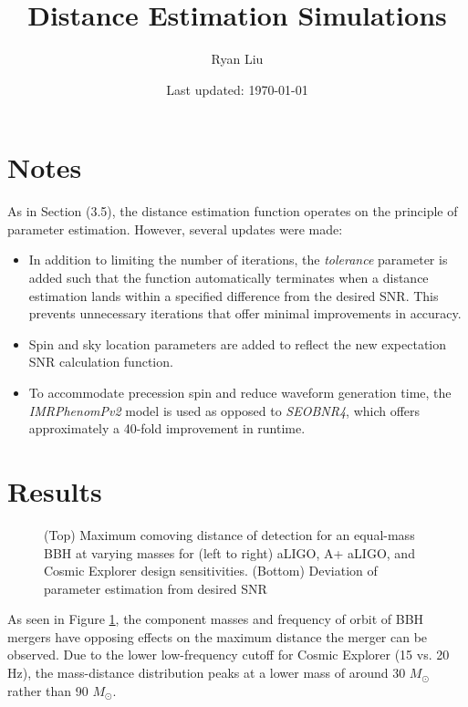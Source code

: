 \documentclass{article}
\title{Distance Estimation Simulations}
\author{Ryan Liu}
\date{Last updated: \today}
\begin{document}
\maketitle

\section{Notes}

As in Section (3.5), the distance estimation function operates on the principle of parameter estimation. However, several updates were made:
\begin{itemize}
    \item In addition to limiting the number of iterations, the \textit{tolerance} parameter is added such that the function automatically terminates when a distance estimation lands within a specified difference from the desired SNR. This prevents unnecessary iterations that offer minimal improvements in accuracy. 
    \item Spin and sky location parameters are added to reflect the new expectation SNR calculation function. 
    \item To accommodate precession spin and reduce waveform generation time, the \textit{IMRPhenomPv2} model is used as opposed to \textit{SEOBNR4}, which offers approximately a 40-fold improvement in runtime. 
\end{itemize}

\section{Results}

\begin{figure}[!htb]
    \caption{\label{fig:dist} (Top) Maximum comoving distance of detection for an equal-mass BBH at varying masses for (left to right) aLIGO, A+ aLIGO, and Cosmic Explorer design sensitivities. (Bottom) Deviation of parameter estimation from desired SNR}
\end{figure}

As seen in Figure \ref{fig:dist}, the component masses and frequency of orbit of BBH mergers have opposing effects on the maximum distance the merger can be observed. Due to the lower low-frequency cutoff for Cosmic Explorer (15 vs. 20 Hz), the mass-distance distribution peaks at a lower mass of around 30 $M_\odot$ rather than 90 $M_\odot$. \\
\end{document}
